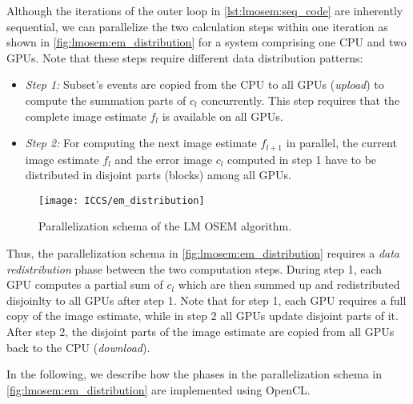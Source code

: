 Although the iterations of the outer loop in \autoref{lst:lmosem:seq_code} are inherently sequential, we can parallelize the two calculation steps within one iteration as shown in \autoref{fig:lmosem:em_distribution} for a system comprising one CPU and two GPUs.
Note that these steps require different data distribution patterns:
\begin{itemize}
  \item[] \emph{Step 1:} Subset's events are copied from the CPU to all GPUs (\emph{upload}) to compute the summation parts of $c_l$ concurrently. This step requires that the complete image estimate $f_l$ is available on all GPUs.
  \item[] \emph{Step 2:} For computing the next image estimate $f_{l+1}$ in parallel, the current image estimate $f_l$ and the error image $c_l$ computed in step 1 have to be distributed in disjoint parts (blocks) among all GPUs.
\end{itemize}

\begin{figure}
  \centering
  \texttt{[image: ICCS/em\_distribution]}
  \caption{Parallelization schema of the LM OSEM algorithm.}
  \label{fig:lmosem:em_distribution}
\end{figure}
Thus, the parallelization schema in \autoref{fig:lmosem:em_distribution} requires a \emph{data redistribution} phase between the two computation steps.
During step 1, each GPU computes a partial sum of $c_l$ which are then summed up and redistributed disjoinlty to all GPUs after step 1.
Note that for step 1, each GPU requires a full copy of the image estimate, while in step 2 all GPUs update disjoint parts of it.
After step 2, the disjoint parts of the image estimate are copied from all GPUs back to the CPU (\emph{download}).

\bigskip\noindent
In the following, we describe how the phases in the parallelization schema in \autoref{fig:lmosem:em_distribution} are implemented using OpenCL.

